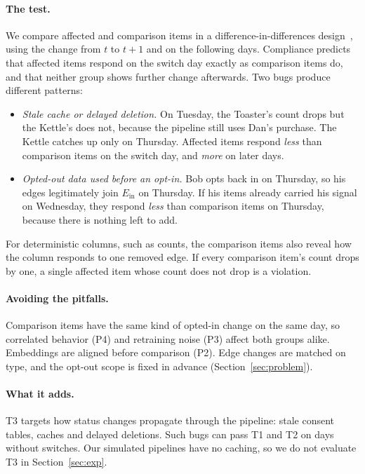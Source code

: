 \documentclass[10pt,twocolumn,letterpaper]{article}
\theoremstyle{definition}
\newcommand{\Ein}{E_{\mathrm{in}}}
\begin{document}
\paragraph{The test.}
We compare affected and comparison items in a difference-in-differences
design~\citep{angrist2009mostly}, using the change from $t$ to $t{+}1$ and on the
following days. Compliance predicts that affected items respond on the switch
day exactly as comparison items do, and that neither group shows further
change afterwards. Two bugs produce different patterns:
\begin{itemize}
  \item \emph{Stale cache or delayed deletion.} On Tuesday, the Toaster's count
        drops but the Kettle's does not, because the pipeline still uses Dan's
        purchase. The Kettle catches up only on Thursday. Affected items
        respond \emph{less} than comparison items on the switch day, and
        \emph{more} on later days.
  \item \emph{Opted-out data used before an opt-in.} Bob opts back in on
        Thursday, so his edges legitimately join $\Ein$ on Thursday. If his items
        already carried his signal on Wednesday, they respond \emph{less} than
        comparison items on Thursday, because there is nothing left to add.
\end{itemize}
For deterministic columns, such as counts, the comparison items also reveal
how the column responds to one removed edge. If every comparison item's count
drops by one, a single affected item whose count does not drop is a
violation.

\paragraph{Avoiding the pitfalls.}
Comparison items have the same kind of opted-in change on the same day, so
correlated behavior (P4) and retraining noise (P3) affect both groups alike.
Embeddings are aligned before comparison (P2). Edge changes are matched on type,
and the opt-out scope is fixed in advance (Section~\ref{sec:problem}).

\paragraph{What it adds.}
T3 targets how status changes propagate through the pipeline: stale consent
tables, caches and delayed deletions. Such bugs can pass T1 and T2 on days
without switches. Our simulated pipelines have no caching, so we do not
evaluate T3 in Section~\ref{sec:exp}.
\end{document}
